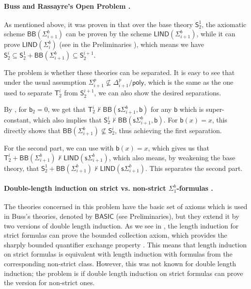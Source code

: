 \documentclass[11pt]{article}
\newcommand{\poly}{\mathsf{poly}}
\newcommand{\SOT}{\mathsf{S}^1_2}
\newcommand{\bd}{\mathsf{b}}
\theoremstyle{definition}
\theoremstyle{definition}
\theoremstyle{remark}
\begin{document}
\vspace{-1em}
\paragraph{Buss and Rassayre's Open Problem \cite{clote1993open}.}As mentioned above, it was proven in \cite{buss1985bounded} that over the base theory $\SOT$, the axiomatic scheme $\mathsf{BB}(\Sigma^b_{i+1})$ can be proven by the scheme $\mathsf{LIND}(\Sigma^b_{i+1})$, while it can prove $\mathsf{LIND}(\Sigma^b_{i})$ (see in the Preliminaries ), which means we have $\mathsf{S}^{i}_2\subseteq \SOT +\mathsf{BB}(\Sigma^b_{i+1})\subseteq \mathsf{S}^{i+1}_2$.

The problem is whether these theories can be separated.
It is easy to see that under the usual assumption $\Sigma^p_{i+1}\not\subseteq \Delta^p_{i+1}/\poly$, which is the same as the one used to separate $\mathsf{T}^i_2$ from $\mathsf{S}^{i+1}_2$, we can also show the desired separations. 

By , for $\bd_2=0$, we get that $\mathsf{T}^i_2\not\vdash \mathsf{BB}(\mathsf{s}\Sigma^b_{i+1},\bd)$ for any $\bd$ which is super-constant, which also implies that $\mathsf{S}^i_2\not\vdash \mathsf{BB}(\mathsf{s}\Sigma^b_{i+1},\bd)$. For $\bd(x)=x$, this directly shows that $\mathsf{BB}(\Sigma^b_{i+1})\not\subseteq \mathsf{S}^i_2$, thus achieving the first separation. 

For the second part, we can use  with $\bd(x)=x$, which gives us that $\mathsf{T}^i_2+\mathsf{BB}(\Sigma^b_{i+1}) \nvdash \mathsf{LIND}(\mathsf{s}\Sigma^b_{i+1})$, which also means, by weakening the base theory, that $\SOT+\mathsf{BB}(\Sigma^b_{i+1}) \nvdash\mathsf{LIND}(\mathsf{s}\Sigma^b_{i+1})$. This separates the second part.

\vspace{-1em}
\paragraph{Double-length induction on strict vs. non-strict $\Sigma^b_1$-formulas \cite{pollett1997arithmetic}.}The theories concerned in this problem have the basic set of axioms which is used in Buss's theories, denoted by $\mathsf{BASIC}$ (see Preliminaries), but they extend it by two versions of double length induction. As we see in , the length induction for strict formulas can prove the bounded collection axiom, which provides the sharply bounded quantifier exchange property . This means that length induction on strict formulas is equivalent with length induction with formulas from the corresponding non-strict class. However, this was not known for double length induction; the problem is if double length induction on strict formulas can prove the version for non-strict ones.
\end{document}

